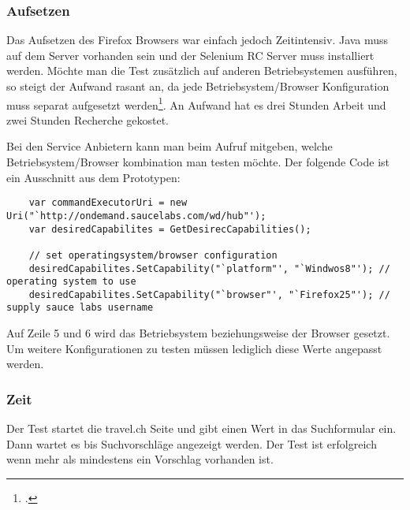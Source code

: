 \subsubsection{Aufsetzen}
Das Aufsetzen des Firefox Browsers war einfach jedoch Zeitintensiv. Java muss auf dem Server vorhanden sein und der Selenium RC Server muss installiert werden. Möchte man die Test zusätzlich auf anderen Betriebsystemen ausführen, so steigt der Aufwand rasant an, da jede Betriebsystem/Browser Konfiguration muss separat aufgesetzt werden\footcite{Selenium_Linux}. An Aufwand hat es drei Stunden Arbeit und zwei Stunden Recherche gekostet.

Bei den Service Anbietern kann man beim Aufruf mitgeben, welche Betriebsystem/Browser kombination man testen möchte. Der folgende Code ist ein Ausschnitt aus dem Prototypen:

\begin{lstlisting}
    var commandExecutorUri = new Uri("`http://ondemand.saucelabs.com/wd/hub"');
    var desiredCapabilites = GetDesirecCapabilities();

    // set operatingsystem/browser configuration
    desiredCapabilites.SetCapability("`platform"', "`Windwos8"'); // operating system to use
    desiredCapabilites.SetCapability("`browser"', "`Firefox25"'); // supply sauce labs username
\end{lstlisting}
Auf Zeile 5 und 6 wird das Betriebsystem beziehungsweise der Browser gesetzt. Um weitere Konfigurationen zu testen müssen lediglich diese Werte angepasst werden.

\subsubsection{Zeit}
Der Test startet die travel.ch Seite und gibt einen Wert in das Suchformular ein. Dann wartet es bis Suchvorschläge angezeigt werden. Der Test ist erfolgreich wenn mehr als mindestens ein Vorschlag vorhanden ist.

